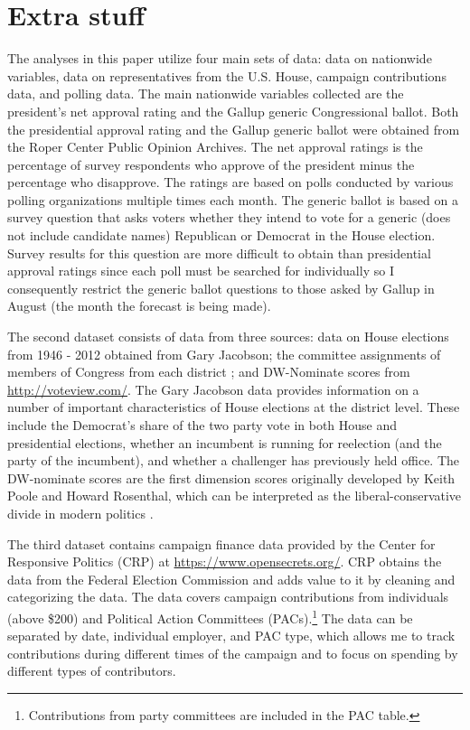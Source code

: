 \documentclass[12pt,final,fleqn]{article}
\theoremstyle{plain}
\begin{document}
\section{Extra stuff}
The analyses in this paper utilize four main sets of data: data on nationwide variables, data on representatives from the U.S. House, campaign contributions data, and polling data. The main nationwide variables collected are the president's net approval rating and the Gallup generic Congressional ballot. Both the presidential approval rating and the Gallup generic ballot were obtained from the Roper Center Public Opinion Archives. The net approval ratings is the percentage of survey respondents who approve of the president minus the percentage who disapprove. The ratings are based on polls conducted by various polling organizations multiple times each month. The generic ballot is based on a survey question that asks voters whether they intend to vote for a generic (does not include candidate names) Republican or Democrat in the House election. Survey results for this question are more difficult to obtain than presidential approval ratings since each poll must be searched for individually so I consequently restrict the generic ballot questions to those asked by Gallup in August (the month the forecast is being made).

The second dataset consists of data from three sources: data on  House elections from 1946 - 2012 obtained from Gary Jacobson; the committee assignments of members of Congress from each district \citep{stewart2015}; and DW-Nominate scores from \url{http://voteview.com/}. The Gary Jacobson data provides information on a number of important characteristics of House elections at the district level. These include the Democrat's share of the two party vote in both House and presidential elections, whether an incumbent is running for reelection (and the party of the incumbent), and whether a challenger has previously held office. The DW-nominate scores are the first dimension scores originally developed by Keith Poole and Howard Rosenthal, which can be interpreted as the liberal-conservative divide in modern politics \citep{poole1997congress, poole2011ideology}.

The third dataset contains campaign finance data provided by the Center for Responsive Politics (CRP) at \url{https://www.opensecrets.org/}. CRP obtains the data from the Federal Election Commission and adds value to it by cleaning and categorizing the data. The data covers campaign contributions from individuals (above \$200) and Political Action Committees (PACs).\footnote{Contributions from party committees are included in the PAC table.} The data can be separated by date, individual employer, and PAC type, which allows me to track contributions during different times of the campaign and to focus on spending by different types of contributors. 
\end{document}
